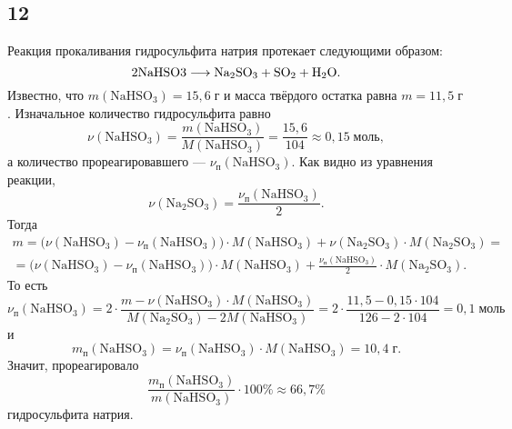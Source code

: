 \subsection{12}

Реакция прокаливания гидросульфита натрия протекает следующими образом:
\[
\rm 2NaHSO3\longrightarrow Na_2SO_3+SO_2+H_2O.
\]
Известно, что $m(\mathrm{NaHSO_3})=15{,}6\;\text{г}$ и масса твёрдого остатка равна $m=11{,}5\;\text{г}$. Изначальное количество гидросульфита равно
\[
\nu(\mathrm{NaHSO_3})=\frac{m(\mathrm{NaHSO_3})}{M(\mathrm{NaHSO_3})}=\frac{15{,}6}{104}\approx0{,}15\;\text{моль},
\]
а количество прореагировавшего --- $\nu_\text{п}(\mathrm{NaHSO_3})$.
Как видно из уравнения реакции,
\[
\nu(\mathrm{Na_2SO_3})=\frac{\nu_\text{п}(\mathrm{NaHSO_3})}{2}.
\]
Тогда
\begin{multline*}
m=\bigl(\nu(\mathrm{NaHSO_3})-\nu_\text{п}(\mathrm{NaHSO_3})\bigr)\cdot M(\mathrm{NaHSO_3})+\nu(\mathrm{Na_2SO_3})\cdot M(\mathrm{Na_2SO_3})= \\
=\bigl(\nu(\mathrm{NaHSO_3})-\nu_\text{п}(\mathrm{NaHSO_3})\bigr)\cdot M(\mathrm{NaHSO_3})+\frac{\nu_\text{п}(\mathrm{NaHSO_3})}{2}\cdot M(\mathrm{Na_2SO_3}).
\end{multline*}
То есть
\[
\nu_\text{п}(\mathrm{NaHSO_3})=2\cdot\frac{m-\nu(\mathrm{NaHSO_3})\cdot M(\mathrm{NaHSO_3})}{M(\mathrm{Na_2SO_3})-2M(\mathrm{NaHSO_3})}=2\cdot\frac{11{,}5-0{,}15\cdot104}{126-2\cdot104}=0{,}1\;\text{моль}
\]
и
\[
m_\text{п}(\mathrm{NaHSO_3})=\nu_\text{п}(\mathrm{NaHSO_3})\cdot M(\mathrm{NaHSO_3})=10{,}4\;\text{г}.
\]
Значит, прореагировало
\[
\frac{m_\text{п}(\mathrm{NaHSO_3})}{m(\mathrm{NaHSO_3})}\cdot100\%\approx66{,}7\%
\]
гидросульфита натрия.
